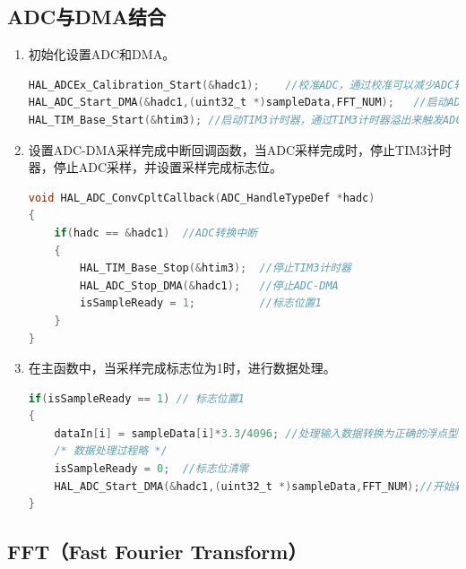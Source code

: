 \documentclass{article}
\begin{document}
\subsection{ADC与DMA结合}
\begin{enumerate}
    \item 初始化设置ADC和DMA。
\begin{lstlisting}[language={C}]
HAL_ADCEx_Calibration_Start(&hadc1);    //校准ADC，通过校准可以减少ADC转换中的误差。
HAL_ADC_Start_DMA(&hadc1,(uint32_t *)sampleData,FFT_NUM);   //启动ADC，并使能DMA传输，将采样数据传输到内存中(sampleData)。
HAL_TIM_Base_Start(&htim3); //启动TIM3计时器，通过TIM3计时器溢出来触发ADC采样。
\end{lstlisting}
    \item 设置ADC-DMA采样完成中断回调函数，当ADC采样完成时，停止TIM3计时器，停止ADC采样，并设置采样完成标志位。
\begin{lstlisting}[language={C}]
void HAL_ADC_ConvCpltCallback(ADC_HandleTypeDef *hadc)
{
    if(hadc == &hadc1)  //ADC转换中断
    {
        HAL_TIM_Base_Stop(&htim3);  //停止TIM3计时器
        HAL_ADC_Stop_DMA(&hadc1);   //停止ADC-DMA
        isSampleReady = 1;          //标志位置1
    }
}
\end{lstlisting}
    \item 在主函数中，当采样完成标志位为1时，进行数据处理。
\begin{lstlisting}[language={C}]
if(isSampleReady == 1) // 标志位置1
{
    dataIn[i] = sampleData[i]*3.3/4096; //处理输入数据转换为正确的浮点型
    /* 数据处理过程略 */
    isSampleReady = 0;  //标志位清零
    HAL_ADC_Start_DMA(&hadc1,(uint32_t *)sampleData,FFT_NUM);//开始新一轮数据的读入
}
\end{lstlisting}
\end{enumerate}
\subsection{FFT（Fast Fourier Transform）}
\end{document}
